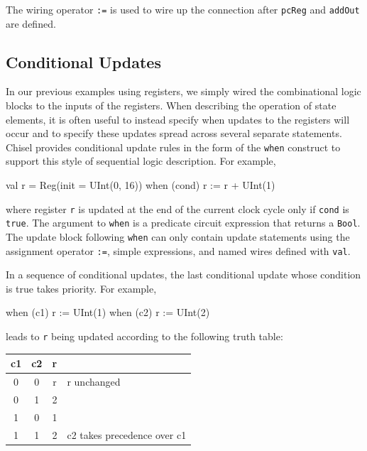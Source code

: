 \documentclass[twocolumn,10pt]{article}
\def\code#1{{\tt #1}}
\begin{document}
\noindent
The wiring operator
\verb!:=! is used to wire up
the connection after \verb!pcReg! and \verb!addOut! are defined.

\subsection{Conditional Updates}

In our previous examples using registers, we simply wired the
combinational logic blocks to the inputs of the registers.
When describing the operation of state
elements, it is often useful to instead specify when updates to the
registers will occur and to specify these updates spread across
several separate statements.  Chisel provides conditional update rules
in the form of the \code{when} construct to support this style of
sequential logic description. For example,
\begin{scala}
val r = Reg(init = UInt(0, 16))
when (cond) {
  r := r + UInt(1)
}
\end{scala}

\noindent
where register \code{r} is updated at the end of the current clock
cycle only if \verb+cond+ is \code{true}.  The argument to \code{when} is a
predicate circuit expression that returns a \code{Bool}.  The update
block following \code{when} can only contain update statements using
the assignment operator \verb+:=+, simple expressions, and named wires
defined with \code{val}.

In a sequence of conditional updates, the last conditional update
whose condition is true takes priority.  For example,
\begin{scala}
when (c1) { r := UInt(1) }
when (c2) { r := UInt(2) }
\end{scala}

\noindent
leads to \code{r} being updated according to the following truth table:
\begin{center}
{\small
\begin{tabular}{|c|c|c|l|}
\hline
c1 & c2  &  r & \\
\hline
0 &  0 & r &  r unchanged \\
0 &  1 & 2 & \\
1 &  0 & 1 & \\
1 &  1 & 2& c2 takes precedence over c1 \\
\hline
\end{tabular}
}
\end{center}
\end{document}
